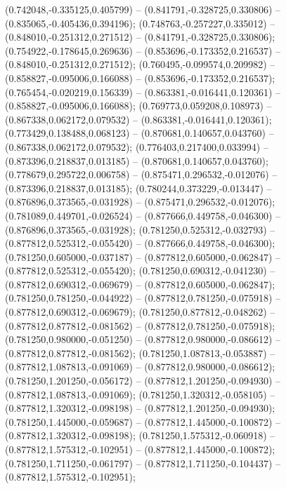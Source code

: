  (0.742048,-0.335125,0.405799) -- (0.841791,-0.328725,0.330806) -- (0.835065,-0.405436,0.394196);
 (0.748763,-0.257227,0.335012) -- (0.848010,-0.251312,0.271512) -- (0.841791,-0.328725,0.330806);
 (0.754922,-0.178645,0.269636) -- (0.853696,-0.173352,0.216537) -- (0.848010,-0.251312,0.271512);
 (0.760495,-0.099574,0.209982) -- (0.858827,-0.095006,0.166088) -- (0.853696,-0.173352,0.216537);
 (0.765454,-0.020219,0.156339) -- (0.863381,-0.016441,0.120361) -- (0.858827,-0.095006,0.166088);
 (0.769773,0.059208,0.108973) -- (0.867338,0.062172,0.079532) -- (0.863381,-0.016441,0.120361);
 (0.773429,0.138488,0.068123) -- (0.870681,0.140657,0.043760) -- (0.867338,0.062172,0.079532);
 (0.776403,0.217400,0.033994) -- (0.873396,0.218837,0.013185) -- (0.870681,0.140657,0.043760);
 (0.778679,0.295722,0.006758) -- (0.875471,0.296532,-0.012076) -- (0.873396,0.218837,0.013185);
 (0.780244,0.373229,-0.013447) -- (0.876896,0.373565,-0.031928) -- (0.875471,0.296532,-0.012076);
 (0.781089,0.449701,-0.026524) -- (0.877666,0.449758,-0.046300) -- (0.876896,0.373565,-0.031928);
 (0.781250,0.525312,-0.032793) -- (0.877812,0.525312,-0.055420) -- (0.877666,0.449758,-0.046300);
 (0.781250,0.605000,-0.037187) -- (0.877812,0.605000,-0.062847) -- (0.877812,0.525312,-0.055420);
 (0.781250,0.690312,-0.041230) -- (0.877812,0.690312,-0.069679) -- (0.877812,0.605000,-0.062847);
 (0.781250,0.781250,-0.044922) -- (0.877812,0.781250,-0.075918) -- (0.877812,0.690312,-0.069679);
 (0.781250,0.877812,-0.048262) -- (0.877812,0.877812,-0.081562) -- (0.877812,0.781250,-0.075918);
 (0.781250,0.980000,-0.051250) -- (0.877812,0.980000,-0.086612) -- (0.877812,0.877812,-0.081562);
 (0.781250,1.087813,-0.053887) -- (0.877812,1.087813,-0.091069) -- (0.877812,0.980000,-0.086612);
 (0.781250,1.201250,-0.056172) -- (0.877812,1.201250,-0.094930) -- (0.877812,1.087813,-0.091069);
 (0.781250,1.320312,-0.058105) -- (0.877812,1.320312,-0.098198) -- (0.877812,1.201250,-0.094930);
 (0.781250,1.445000,-0.059687) -- (0.877812,1.445000,-0.100872) -- (0.877812,1.320312,-0.098198);
 (0.781250,1.575312,-0.060918) -- (0.877812,1.575312,-0.102951) -- (0.877812,1.445000,-0.100872);
 (0.781250,1.711250,-0.061797) -- (0.877812,1.711250,-0.104437) -- (0.877812,1.575312,-0.102951);
